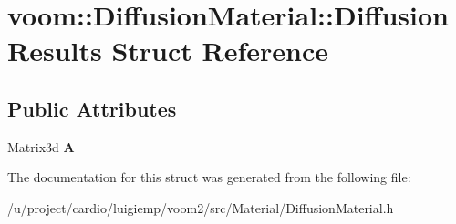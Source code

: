 \hypertarget{structvoom_1_1_diffusion_material_1_1_diffusion_results}{
\section{voom::DiffusionMaterial::DiffusionResults Struct Reference}
\label{structvoom_1_1_diffusion_material_1_1_diffusion_results}
}
\subsection*{Public Attributes}
\begin{DoxyCompactItemize}
\item 
\hypertarget{structvoom_1_1_diffusion_material_1_1_diffusion_results_afa2d64a8150db30a6f16b468159d20c1}{
Matrix3d {\bfseries A}}
\label{structvoom_1_1_diffusion_material_1_1_diffusion_results_afa2d64a8150db30a6f16b468159d20c1}

\end{DoxyCompactItemize}


The documentation for this struct was generated from the following file:\begin{DoxyCompactItemize}
\item 
/u/project/cardio/luigiemp/voom2/src/Material/DiffusionMaterial.h\end{DoxyCompactItemize}
